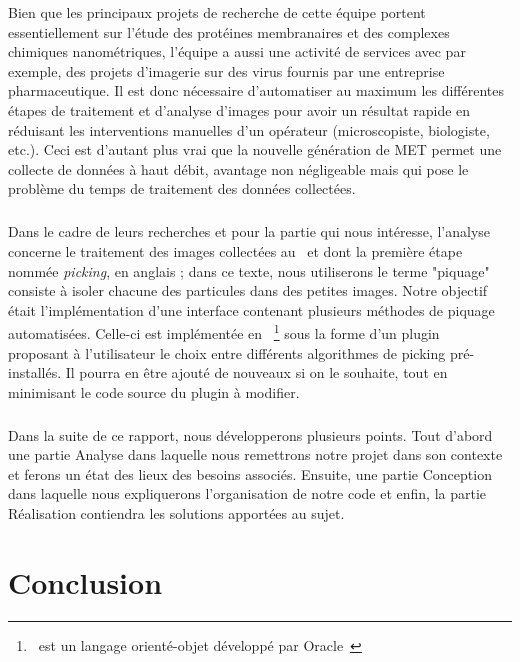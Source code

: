 \documentclass[12pt,a4paper]{report}
\begin{document}
Bien que les principaux projets de recherche de cette équipe portent essentiellement sur l'étude des protéines membranaires et des complexes chimiques nanométriques, l'équipe a aussi une activité de services avec par exemple, des projets d'imagerie sur des virus fournis par une entreprise pharmaceutique. Il est donc nécessaire d'automatiser au maximum les différentes étapes de traitement et d'analyse d'images pour avoir un résultat rapide en réduisant les interventions manuelles d'un opérateur (microscopiste, biologiste, etc.). Ceci est d'autant plus vrai que la nouvelle génération de MET permet une collecte de données à haut débit, avantage non négligeable mais qui pose le problème du temps de traitement des données collectées. 

\paragraph*{}
Dans le cadre de leurs recherches et pour la partie qui nous intéresse, l'analyse concerne le traitement des images collectées au \me ~et dont la première étape \- nommée \textit{picking}, en anglais ; dans ce texte, nous utiliserons le terme "piquage" \- consiste à isoler chacune des particules dans des petites images.  %
Notre objectif était l'implémentation d'une interface contenant plusieurs méthodes de piquage automatisées.
Celle-ci est implémentée en \java ~\footnote{\java\ est un langage orienté-objet développé par Oracle~\cite{java:url}} sous la forme d'un plugin \imj ~\cite{imagej:url} proposant à l'utilisateur le choix entre différents algorithmes de picking pré-installés. Il pourra en \^etre ajouté de nouveaux si on le souhaite, tout en minimisant le code source du plugin à modifier.  

\paragraph*{}
Dans la suite de ce rapport, nous développerons plusieurs points. Tout d'abord une partie Analyse dans laquelle nous remettrons notre projet dans son contexte et ferons un état des lieux des besoins associés. Ensuite, une partie Conception dans laquelle nous expliquerons l'organisation de notre code et enfin, la partie Réalisation contiendra les solutions apportées au sujet.







\chapter*{Conclusion}
\end{document}
